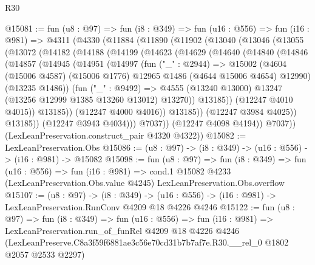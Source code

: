 \begin{lexlean}{R30}
\begin{coremodule}
@15081 := fun (u8 : @97) =>
  fun (i8 : @349) =>
  fun (u16 : @556) =>
  fun (i16 : @981) =>
  @4311
    (@4330
      (@11884
        (@11890
          (@11902
            (@13040
              (@13046
                (@13055
                  (@13072
                    (@14182
                      (@14188
                        (@14199
                          (@14623
                            (@14629
                              (@14640
                                (@14840
                                  (@14846
                                    (@14857
                                      (@14945
                                        (@14951
                                          (@14997
                                            (fun ("_" : @2944) =>
                                            @15002
                                              (@4604
                                                (@15006 @4587)
                                                (@15006 @1776)
                                                @12965
                                                @1486
                                                (@4644 @15006 @4654)
                                                @12990)
                                              (@13235 @1486))
                                            (fun ("_" : @9492) =>
                                            @4555
                                              (@13240 @13000)
                                              @13247
                                              (@13256 @12999 @1385 @13260 @13012)
                                              @13270))
                                          @13185))
                                      (@12247 @4010 @4015))
                                    @13185))
                                (@12247 @4000 @4016))
                              @13185))
                          (@12247 @3984 @4025))
                        @13185))
                    (@12247 @3943 @4034)))
                @7037))
            (@12247 @4098 @4194))
          @7037))
      (LexLeanPreservation.construct_pair @4320 @4322))
@15082 := LexLeanPreservation.Obs
@15086 := (u8 : @97) -> (i8 : @349) -> (u16 : @556) -> (i16 : @981) -> @15082
@15098 := fun (u8 : @97) =>
  fun (i8 : @349) =>
  fun (u16 : @556) =>
  fun (i16 : @981) =>
  cond.{1} @15082 @4233 (LexLeanPreservation.Obs.value @4245) LexLeanPreservation.Obs.overflow
@15107 := (u8 : @97) ->
  (i8 : @349) -> (u16 : @556) -> (i16 : @981) -> LexLeanPreservation.RunConv @4209 @18 @4226 @4246
@15122 := fun (u8 : @97) =>
  fun (i8 : @349) =>
  fun (u16 : @556) =>
  fun (i16 : @981) =>
  LexLeanPreservation.run_of_funRel
    @4209
    @18
    @4226
    @4246
    (LexLeanPreserve.C8a3f59f6881ae3c56e70cd31b7b7af7e.R30.__rel_0 @1802 @2057 @2533 @2297)
\end{coremodule}
\end{lexlean}
